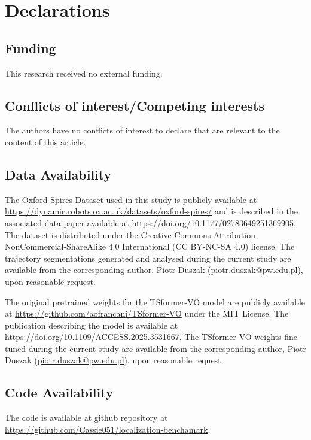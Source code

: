 \documentclass[pdflatex,sn-mathphys-num]{sn-jnl}
\theoremstyle{thmstyleone}%
\theoremstyle{thmstyletwo}%
\theoremstyle{thmstylethree}%
\begin{document}


\section*{Declarations}

\subsection*{Funding}
This research received no external funding.

\subsection*{Conflicts of interest/Competing interests}
The authors have no conflicts of interest to declare that are relevant to the content of this article.

\subsection*{Data Availability}
The Oxford Spires Dataset used in this study is publicly available at \url{https://dynamic.robots.ox.ac.uk/datasets/oxford-spires/} and is described in the associated data paper available at \url{https://doi.org/10.1177/02783649251369905}. The dataset is distributed under the Creative Commons Attribution-NonCommercial-ShareAlike 4.0 International (CC BY-NC-SA 4.0) license. The trajectory segmentations generated and analysed during the current study are available from the corresponding author, Piotr Duszak (\href{mailto:piotr.duszak@pw.edu.pl}{piotr.duszak@pw.edu.pl}), upon reasonable request.

The original pretrained weights for the TSformer-VO model are publicly available at \url{https://github.com/aofrancani/TSformer-VO} under the MIT License. The publication describing the model is available at \url{https://doi.org/10.1109/ACCESS.2025.3531667}. The TSformer-VO weights fine-tuned during the current study are available from the corresponding author, Piotr Duszak (\href{mailto:piotr.duszak@pw.edu.pl}{piotr.duszak@pw.edu.pl}), upon reasonable request.


\subsection*{Code Availability}
The code is available at github repository at \url{https://github.com/Cassie051/localization-benchamark}.
\end{document}
